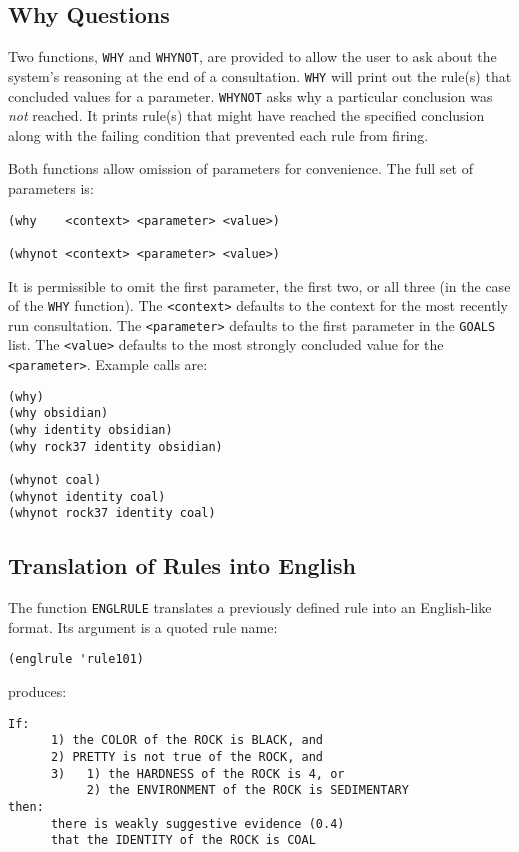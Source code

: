 \subsection{Why Questions}

Two functions, {\tt WHY} and {\tt WHYNOT}, are provided to allow the user to
ask about the system's reasoning at the end of a consultation.
{\tt WHY} will print out the rule(s) that concluded values for a parameter.
{\tt WHYNOT} asks why a particular conclusion was {\em not} reached.  It prints
rule(s) that might have reached the specified conclusion along with the
failing condition that prevented each rule from firing.

Both functions allow omission of parameters for convenience.  The full set of
parameters is:

\begin{verbatim}
(why    <context> <parameter> <value>)

(whynot <context> <parameter> <value>)
\end{verbatim}

It is permissible to omit the first parameter, the first two, or all three
(in the case of the {\tt WHY} function).
The {\tt <context>} defaults to the context for the most recently run
consultation.  The {\tt <parameter>} defaults to the first parameter in the
{\tt GOALS} list.  The {\tt <value>} defaults to the most strongly concluded
value for the {\tt <parameter>}.  Example calls are:

\begin{verbatim}
(why)
(why obsidian)
(why identity obsidian)
(why rock37 identity obsidian)

(whynot coal)
(whynot identity coal)
(whynot rock37 identity coal)
\end{verbatim}

\subsection{Translation of Rules into English}

The function {\tt ENGLRULE} translates a previously defined rule into an
English-like format.  Its argument is a quoted rule name:

\begin{verbatim}
(englrule 'rule101)
\end{verbatim}

produces:

\begin{verbatim}
If:
      1) the COLOR of the ROCK is BLACK, and
      2) PRETTY is not true of the ROCK, and
      3)   1) the HARDNESS of the ROCK is 4, or
           2) the ENVIRONMENT of the ROCK is SEDIMENTARY
then:
      there is weakly suggestive evidence (0.4)
      that the IDENTITY of the ROCK is COAL
\end{verbatim}

